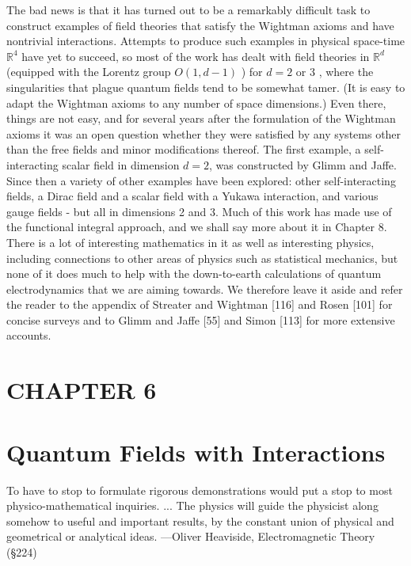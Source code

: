 \documentclass[10pt, letterpaper]{article}
\begin{document}
The bad news is that it has turned out to be a remarkably difficult task to construct examples of field theories that satisfy the Wightman axioms and have nontrivial interactions. Attempts to produce such examples in physical space-time $\mathbb{R}^{4}$ have yet to succeed, so most of the work has dealt with field theories in $\mathbb{R}^{d}$ (equipped with the Lorentz group $O(1, d-1)$ ) for $d=2$ or 3 , where the singularities that plague quantum fields tend to be somewhat tamer. (It is easy to adapt the Wightman axioms to any number of space dimensions.) Even there, things are not easy, and for several years after the formulation of the Wightman axioms it was an open question whether they were satisfied by any systems other than the free fields and minor modifications thereof. The first example, a self-interacting scalar field in dimension $d=2$, was constructed by Glimm and Jaffe. Since then a variety of other examples have been explored: other self-interacting fields, a Dirac field and a scalar field with a Yukawa interaction, and various gauge fields - but all in dimensions 2 and 3. Much of this work has made use of the functional integral approach, and we shall say more about it in Chapter 8. There is a lot of interesting mathematics in it as well as interesting physics, including connections to other areas of physics such as statistical mechanics, but none of it does much to help with the down-to-earth calculations of quantum electrodynamics that we are aiming towards. We therefore leave it aside and refer the reader to the appendix of Streater and Wightman [116] and Rosen [101] for concise surveys and to Glimm and Jaffe [55] and Simon [113] for more extensive accounts.

\section*{CHAPTER 6}
\section*{Quantum Fields with Interactions}
\begin{displayquote}
To have to stop to formulate rigorous demonstrations would put a stop to most physico-mathematical inquiries. ... The physics will guide the physicist along somehow to useful and important results, by the constant union of physical and geometrical or analytical ideas. —Oliver Heaviside, Electromagnetic Theory (§224)
\end{displayquote}
\end{document}
